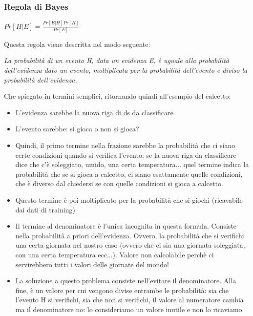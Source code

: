 \newpage

\subsubsection{Regola di Bayes}
\begin{center}
    \begin{math}
        Pr[ H | E] = \frac{Pr[E | H] Pr[H]}{Pr[E]}
    \end{math}
\end{center}
Questa regola viene descritta nel modo seguente:
\begin{center}
    \textit{La probabilità di un evento H, data un evidenza E, è uguale alla probabilità dell'evidenza dato un evento, moltiplicata per la probabilità dell'evento e diviso la probabilità dell'evidenza.}
\end{center}
Che spiegato in termini semplici, ritornando quindi all'esempio del calcetto:
\begin{itemize}
    \item L'evidenza sarebbe la nuova riga di ds da classificare.
    \item L'evento sarebbe: si gioca o non si gioca?
    \item Quindi, il primo termine nella frazione sarebbe la probabilità che ci siano certe condizioni quando si verifica l'evento: se la nuova riga da classificare dice che c'è soleggiato, umido, una certa temperatura... quel termine indica la probabilità che se si gioca a calcetto, ci siano esattamente quelle condizioni, che è diverso dal chiedersi se con quelle condizioni si gioca a calcetto.
    \item Questo termine è poi moltiplicato per la probabilità che si giochi (ricavabile dai dati di training)
    \item Il termine al denominatore è l'unica incognita in questa formula. Consiste nella probabilità a priori dell'evidenza. Ovvero, la probabilità che si verifichi una certa giornata nel nostro caso (ovvero che ci sia una giornata soleggiata, con una certa temperatura ecc...). Valore non calcolabile perchè ci servirebbero tutti i valori delle giornate del mondo!
    \item La soluzione a questo problema consiste nell'evitare il denominatore. Alla fine, è un valore per cui vengono divise entrambe le probabilità: sia che l'evento H si verifichi, sia che non si verifichi, il valore al numeratore cambia ma il denominatore no: lo consideriamo un valore inutile e non lo ricaviamo.
\end{itemize}
